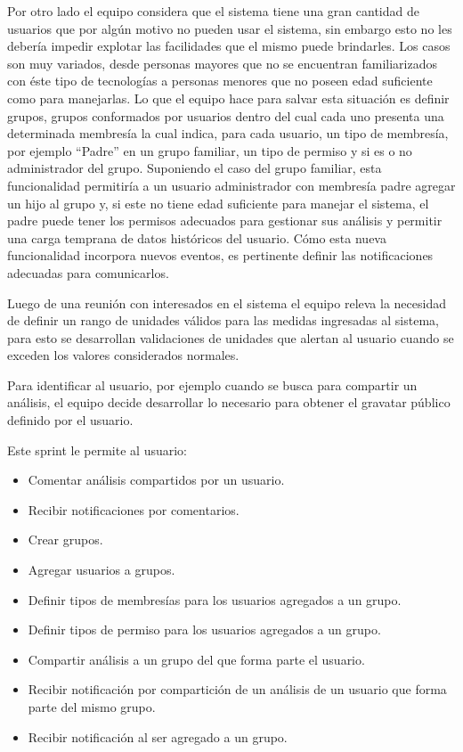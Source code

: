 Por otro lado el equipo considera que el sistema tiene una gran cantidad de usuarios que por algún motivo no pueden usar el sistema, sin embargo esto no les debería impedir explotar las facilidades que el mismo puede brindarles. Los casos son muy variados, desde personas mayores que no se encuentran familiarizados con éste tipo de tecnologías a personas menores que no poseen edad suficiente como para manejarlas. Lo que el equipo hace para salvar esta situación es definir grupos, grupos conformados por usuarios dentro del cual cada uno presenta una determinada membresía la cual indica, para cada usuario, un tipo de membresía, por ejemplo ``Padre'' en un grupo familiar, un tipo de permiso y si es o no administrador del grupo. Suponiendo el caso del grupo familiar, esta funcionalidad permitiría a un usuario administrador con membresía padre agregar un hijo al grupo y, si este no tiene edad suficiente para manejar el sistema, el padre puede tener los permisos adecuados para gestionar sus análisis y permitir una carga temprana de datos históricos del usuario. Cómo esta nueva funcionalidad incorpora nuevos eventos, es pertinente definir las notificaciones adecuadas para comunicarlos.

Luego de una reunión con interesados en el sistema el equipo releva la necesidad de definir un rango de unidades válidos para las medidas ingresadas al sistema, para esto se desarrollan validaciones de unidades que alertan al usuario cuando se exceden los valores considerados normales.

Para identificar al usuario, por ejemplo cuando se busca para compartir un análisis, el equipo decide desarrollar lo necesario para obtener el gravatar público definido por el usuario.

Este sprint le permite al usuario:
	\begin{itemize}
		\item Comentar análisis compartidos por un usuario.
		\item Recibir notificaciones por comentarios.
		\item Crear grupos.
		\item Agregar usuarios a grupos.
		\item Definir tipos de membresías para los usuarios agregados a un grupo.
		\item Definir tipos de permiso para los usuarios agregados a un grupo.
		\item Compartir análisis a un grupo del que forma parte el usuario.
		\item Recibir notificación por compartición de un análisis de un usuario que forma parte del mismo grupo.
		\item Recibir notificación al ser agregado a un grupo.
	\end{itemize}

